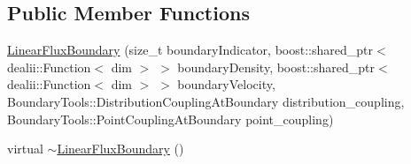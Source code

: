 \subsection*{Public Member Functions}
\begin{DoxyCompactItemize}
\item 
\hyperlink{classnatrium_1_1LinearFluxBoundary_a11da5c0871a45ec24aa7fa2d0e3843d9}{LinearFluxBoundary} (size\_\-t boundaryIndicator, boost::shared\_\-ptr$<$ dealii::Function$<$ dim $>$ $>$ boundaryDensity, boost::shared\_\-ptr$<$ dealii::Function$<$ dim $>$ $>$ boundaryVelocity, BoundaryTools::DistributionCouplingAtBoundary distribution\_\-coupling, BoundaryTools::PointCouplingAtBoundary point\_\-coupling)
\item 
\hypertarget{classnatrium_1_1LinearFluxBoundary_a672e96b41b39f6b77faf7811a981f794}{
virtual \hyperlink{classnatrium_1_1LinearFluxBoundary_a672e96b41b39f6b77faf7811a981f794}{$\sim$LinearFluxBoundary} ()}
\label{classnatrium_1_1LinearFluxBoundary_a672e96b41b39f6b77faf7811a981f794}


\end{DoxyCompactItemize}
